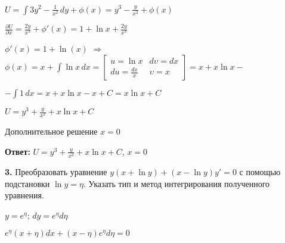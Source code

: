 \documentclass[a4paper]{article}
\begin{document}
\vspace{0.3cm}

$\displaystyle U=\int\limits 3y^2-\frac{1}{x^2}\,dy+\phi(x)=y^3-\frac{y}{x^2}+\phi(x)$

\vspace{0.3cm}

$\displaystyle \frac{\partial U}{\partial x}=\frac{2y}{x^3}+\phi'(x)=1+\ln{x}+\frac{2y}{x^3}$

\vspace{0.3cm}

$\displaystyle \phi'(x)=1+\ln(x)$ $\Rightarrow$ $\displaystyle \phi(x)=x+\int\limits \ln{x}\,dx=\begin{bmatrix}
       u=\ln{x} & d\upsilon=dx           \\[0.3em]
       du=\frac{dx}{x} & \upsilon=x           
     \end{bmatrix}=x+x\ln{x}-$
     
\vspace{0.3cm}
     
$\displaystyle -\int\limits 1\,dx=x+x\ln{x}-x+C=x\ln{x}+C$

\vspace{0.3cm}
     
$\displaystyle U=y^3+\frac{y}{x^2}+x\ln{x}+C$

\vspace{0.3cm}
     
Дополнительное решение $\displaystyle x=0$

\vspace{0.3cm}

\textbf{Ответ: } $\displaystyle U=y^3+\frac{y}{x^2}+x\ln{x}+C$, $\displaystyle x=0$

\vspace{1cm}

\textbf{3.} Преобразовать уравнение $\displaystyle y(x+\ln{y})+(x-\ln{y})y'=0$ с помощью подстановки $\displaystyle \ln{y}=\eta$. Указать тип и метод интегрирования полученного уравнения.

\vspace{0.3cm}

$\displaystyle y=e^{\eta}$; \hspace{0.7cm} $dy=e^{\eta}d\eta$

\vspace{0.3cm}

$\displaystyle e^{\eta}(x+\eta)dx+(x-\eta)e^{\eta}d\eta=0$

\vspace{0.3cm}
\end{document}
